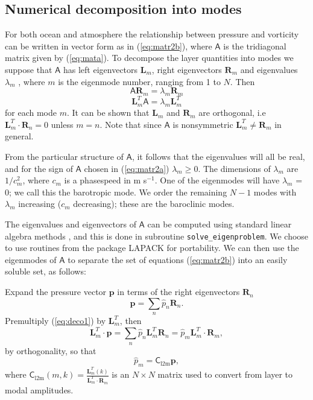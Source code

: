 \documentclass[11pt, a4paper,twoside]{article}
\newcommand{\vc}[1]{\mathbf{#1}}
\newcommand{\mtx}[1]{\vc{\mathsf{#1}}}
\newcommand{\clm}[0]{\mtx{C}_{\mathrm{l2m}}}
\numberwithin{equation}{section}
\begin{document}
\subsection{Numerical decomposition into modes}\label{sub:modes}
For both ocean and atmosphere the relationship between pressure and vorticity can be written in vector form as in (\ref{eq:matr2b}), where $\mtx{A}$ is the tridiagonal matrix given by (\ref{eq:mata}).
To decompose the layer quantities into modes we suppose that $\mtx{A}$ has left eigenvectors $\vc{L}_m$, right eigenvectors $\vc{R}_m$ and eigenvalues   $\lambda_m$  , where $m$ is the eigenmode number, ranging from 1 to $N$.
Then
\[ \mtx{A} \vc{R}_m  =     \lambda_m\vc{R}_m\]
\[ \vc{L}^T_m  \mtx{A}  =    \lambda_m \vc{L}^T_m\]
for each mode $m$.
It can be shown that $\vc{L}_m$  and $\vc{R}_m$  are orthogonal, i.e $\vc{L}_m^T \cdot \vc{R}_n = 0 $ unless $m = n$.
Note that since $\mtx{A}$ is nonsymmetric  $\vc{L}^T_m \ne \vc{R}_m$   in general.

From the particular structure of $\mtx{A}$, it follows that the eigenvalues will all be real, and for the sign of $\mtx{A}$ chosen in (\ref{eq:matr2a})  $\lambda_m \ge  0$.
The dimensions of    $\lambda_m $   are $1/c_m^2$, where $c_m$  is a phasespeed in m s$^{-1}$.
One of the eigenmodes will have    $\lambda_m $   = 0; we call this the barotropic mode.
We order the remaining $N-1$ modes with $\lambda_m$ increasing ($c_m$ decreasing); these are the baroclinic modes.

The eigenvalues and eigenvectors of $\mtx{A}$ can be computed using standard linear algebra methods \citep[see e.g.][]{golub:83}, and this is done in subroutine \verb=solve_eigenproblem=.
We choose to use routines from the package LAPACK for portability.
We can then use the eigenmodes of $\mtx{A}$ to separate the set of equations (\ref{eq:matr2b})
into an easily soluble set, as follows:

Expand the pressure vector $\vc{p}$ in terms of the right eigenvectors $\vc{R}_n$
\begin{equation}\label{eq:deco1}
\vc{p} = \sum_n \hat{p}_n  \vc{R}_n.
\end{equation}
Premultiply (\ref{eq:deco1}) by $\vc{L}_m^T$, then
\begin{equation}\label{eq:deco2}
\vc{L}_m^T \cdot \vc{p} = \sum_n \hat{p}_n \vc{L}_m^T \vc{R}_n=  \hat{p}_m \vc{L}_m^T \cdot \vc{R}_m,
\end{equation}
by orthogonality, so that
\begin{equation}\label{eq:deco3}
\hat{p}_m = \clm \vc{p} ,
\end{equation}
where $\clm(m,k) = \frac{\vc{L}_m^T (k)}{ \vc{L}_m^T \cdot \vc{R}_m}$ is an $N \times N$ matrix used to  convert from layer to modal amplitudes.
\end{document}
